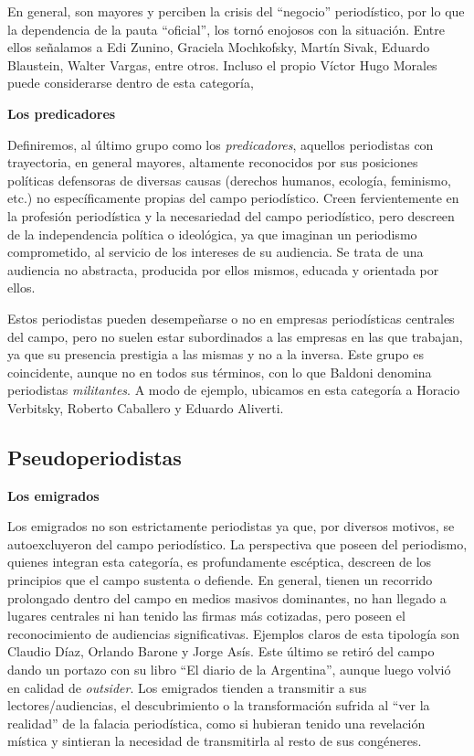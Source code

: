 En general, son mayores y perciben la crisis del ``negocio'' periodístico, por lo que la dependencia de la pauta ``oficial'', los tornó enojosos con la situación. Entre ellos señalamos a Edi Zunino, Graciela Mochkofsky, Martín Sivak, Eduardo Blaustein, Walter Vargas, entre otros. Incluso el propio Víctor Hugo Morales puede considerarse dentro de esta categoría,

\textbf{Los predicadores}

Definiremos, al último grupo como los \emph{predicadores}, aquellos periodistas con trayectoria, en general mayores, altamente reconocidos por sus posiciones políticas defensoras de diversas causas (derechos humanos, ecología, feminismo, etc.) no específicamente propias del campo periodístico. Creen fervientemente en la profesión periodística y la necesariedad del campo periodístico, pero descreen de la independencia política o ideológica, ya que imaginan un periodismo comprometido, al servicio de los intereses de su audiencia. Se trata de una audiencia no abstracta, producida por ellos mismos, educada y orientada por ellos.

Estos periodistas pueden desempeñarse o no en empresas periodísticas centrales del campo, pero no suelen estar subordinados a las empresas en las que trabajan, ya que su presencia prestigia a las mismas y no a la inversa. Este grupo es coincidente, aunque no en todos sus términos, con lo que Baldoni denomina periodistas \emph{militantes}. A modo de ejemplo, ubicamos en esta categoría a Horacio Verbitsky, Roberto Caballero y Eduardo Aliverti.

\subsection {Pseudoperiodistas}

\textbf{Los emigrados}

Los emigrados no son estrictamente periodistas ya que, por diversos motivos, se autoexcluyeron del campo periodístico. La perspectiva que poseen del periodismo, quienes integran esta categoría, es profundamente escéptica, descreen de los principios que el campo sustenta o defiende. En general, tienen un recorrido prolongado dentro del campo en medios masivos dominantes, no han llegado a lugares centrales ni han tenido las firmas más cotizadas, pero poseen el reconocimiento de audiencias significativas. Ejemplos claros de esta tipología son Claudio Díaz, Orlando Barone y Jorge Asís. Este último se retiró del campo dando un portazo con su libro ``El diario de la Argentina'', aunque luego volvió en calidad de \emph{outsider}. Los emigrados tienden a transmitir a sus lectores/audiencias, el descubrimiento o la transformación sufrida al ``ver la realidad'' de la falacia periodística, como si hubieran tenido una revelación mística y sintieran la necesidad de transmitirla al resto de sus congéneres.

